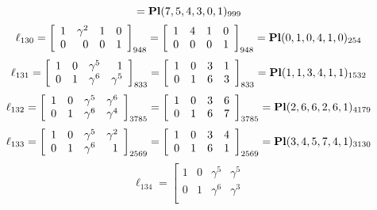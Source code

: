 \documentclass{article}
\begin{document}
{$$={\rm\bf Pl}(7,5,4,3,0,1 )_{999}$$
$$
\ell_{130} = 
\left[
\begin{array}{*{4}{r}}
1 & \gamma^{2} & 1 & 0\\
0 & 0 & 0 & 1\\
\end{array}
\right]
_{948}
=
\left[
\begin{array}{*{4}c}
1  & 4  & 1  & 0\\
0  & 0  & 0  & 1\\
\end{array}
\right]_{948}
={\rm\bf Pl}(0,1,0,4,1,0 )_{254}$$
$$
\ell_{131} = 
\left[
\begin{array}{*{4}{r}}
1 & 0 & \gamma^{5} & 1\\
0 & 1 & \gamma^{6} & \gamma^{5}\\
\end{array}
\right]
_{833}
=
\left[
\begin{array}{*{4}c}
1  & 0  & 3  & 1\\
0  & 1  & 6  & 3\\
\end{array}
\right]_{833}
={\rm\bf Pl}(1,1,3,4,1,1 )_{1532}$$
$$
\ell_{132} = 
\left[
\begin{array}{*{4}{r}}
1 & 0 & \gamma^{5} & \gamma^{6}\\
0 & 1 & \gamma^{6} & \gamma^{4}\\
\end{array}
\right]
_{3785}
=
\left[
\begin{array}{*{4}c}
1  & 0  & 3  & 6\\
0  & 1  & 6  & 7\\
\end{array}
\right]_{3785}
={\rm\bf Pl}(2,6,6,2,6,1 )_{4179}$$
$$
\ell_{133} = 
\left[
\begin{array}{*{4}{r}}
1 & 0 & \gamma^{5} & \gamma^{2}\\
0 & 1 & \gamma^{6} & 1\\
\end{array}
\right]
_{2569}
=
\left[
\begin{array}{*{4}c}
1  & 0  & 3  & 4\\
0  & 1  & 6  & 1\\
\end{array}
\right]_{2569}
={\rm\bf Pl}(3,4,5,7,4,1 )_{3130}$$
$$
\ell_{134} = 
\left[
\begin{array}{*{4}{r}}
1 & 0 & \gamma^{5} & \gamma^{5}\\
0 & 1 & \gamma^{6} & \gamma^{3}\\
\end{array}
$$}
\end{document}
